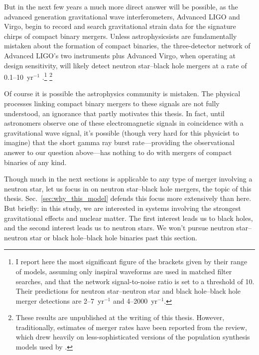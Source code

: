 But in the next few years a much more direct answer will be possible, as the
advanced generation gravitational wave interferometers, Advanced LIGO and Virgo,
begin to record and search gravitational strain data for the signature chirps of
compact binary mergers. Unless astrophysicsists are fundamentally
mistaken about the formation of compact binaries, the three-detector network of
Advanced LIGO's two instruments plus Advanced Virgo, when operating at design
sensitivity, will likely detect neutron star--black hole \nsbh mergers at a
rate of 0.1--10~yr$^{-1}$
\citep[Tables~2 and~3]{domi2014-merger_rates_part3}.\footnote{
I report here the most significant figure of the brackets given by their range
of models, assuming only inspiral waveforms are used in matched filter searches,
and that the network signal-to-noise ratio is set to a threshold of 10.
Their predictions for neutron star--neutron star \nsns
and black hole--black hole \bhbh merger detections are
2--7~yr$^{-1}$ and 4--2000~yr$^{-1}$.}
\footnote{
These results are unpublished at the writing of this thesis.
However, traditionally, estimates of merger rates have been reported from the
\citet{abad2010-rates} review, which drew heavily on less-sophisticated versions
of the population synthesis models used by \citet{domi2014-merger_rates_part3}.}

Of course it is possible the astrophysics community is mistaken.
The physical processes linking compact binary mergers to these
signals are not fully understood, an ignorance that partly motivates this thesis.
In fact, until astronomers observe one of these electromagnetic signals in
coincidence with a gravitational wave signal, it's possible (though very hard
for this physicist to imagine) that the short
gamma ray burst rate---providing the observational answer to our question
above---has nothing to do with mergers of compact binaries of any kind.

Though much in the next sections is applicable to any type of merger involving
a neutron star, let us focus in on neutron star--black hole \nsbh
mergers, the topic of this thesis. Sec.~\ref{sec:why_this_model} defends this
focus more extensively than here.
But briefly: in this study, we are interested in systems involving the
strongest gravitational effects and nuclear matter. The first interest leads us
to black holes, and the second interest leads us to neutron stars.
We won't pursue neutron star--neutron star
\nsns or black hole--black hole \bhbh binaries past this section.

